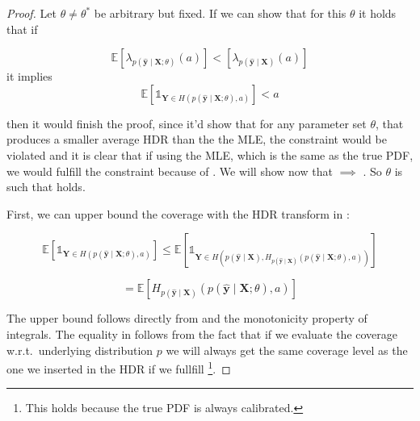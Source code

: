 \begin{proof}
    Let $\theta \neq \theta^*$ be arbitrary but fixed. If we can show that for this $\theta$ it holds that if

    \begin{equation}
        \mathbb{E} \left[ \lambda_{p(\mathbf{\hat{y}}\mid\mathbf{X};\theta)}(a)\right]
        <
        \left[\lambda_{p(\mathbf{\hat{y}}\mid\mathbf{X})}(a) \right]
        \label{eq:inequality_00}
    \end{equation}
    it implies
    \begin{equation}
        \mathbb{E} \left[ \mathds{1}_{\mathbf{Y} \in
        H(p(\mathbf{\hat{y}}\mid \mathbf{X}; \theta), a)} \right] < a
        \label{eq:inequality_01}
    \end{equation}

    then it would finish the proof, since it'd show that for any parameter set $\theta$, that produces a smaller average HDR than the the MLE, the constraint would be violated and it is clear that if using the MLE, which is the same as the true PDF, we would fulfill the constraint because of . We will show now that  $\implies$ . So  $\theta$ is such that  holds.

    First, we can upper bound the coverage with the HDR transform in :

    \begin{equation}
        \mathbb{E} \left[ \mathds{1}_{\mathbf{Y} \in
        H(p(\mathbf{\hat{y}}\mid \mathbf{X}; \theta), a)} \right]
        \leq
        \mathbb{E} \left[ \mathds{1}_{\mathbf{Y} \in
        H(p(\mathbf{\hat{y}} \mid \mathbf{X}), H_{p(\hat{\mathbf{y}}\mid \mathbf{X})}(p(\mathbf{\hat{y}}\mid
        \mathbf{X};
        \theta), a))} \right]
        \label{eq:upper_bound}
    \end{equation}

    \begin{equation}
        = \mathbb{E}\left[H_{p(\hat{\mathbf{y}}\mid \mathbf{X})}(p(\mathbf{\hat{y}}\mid \mathbf{X}; \theta),
            a)
            \right]
        \label{eq:upper_bound_2}
    \end{equation}

    The upper bound follows directly from  and the monotonicity property of integrals. The equality in  follows from the fact that if we evaluate the coverage w.r.t.\ underlying distribution $p$ we will always get the same coverage level as the one we inserted in the HDR if we fullfill \footnote{This holds because the true PDF is always calibrated.}.


\end{proof}
